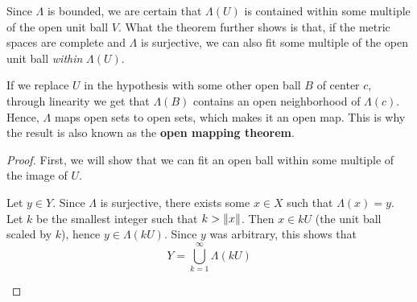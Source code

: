 \documentclass[a4paper, 12pt]{article}
\theoremstyle{definition}
\DeclarePairedDelimiter{\norm}{\lVert}{\rVert}
\begin{document}
Since \(\Lambda\) is bounded, we are certain that \(\Lambda(U)\) is contained within some multiple of the open unit ball \(V\). What the theorem further shows is that, if the metric spaces are complete and \(\Lambda\) is surjective, we can also fit some multiple of the open unit ball \emph{within} \(\Lambda(U)\).

If we replace \(U\) in the hypothesis with some other open ball \(B\) of center \(c\), through linearity we get that \(\Lambda(B)\) contains an open neighborhood of \(\Lambda(c)\). Hence, \(\Lambda\) maps open sets to open sets, which makes it an open map. This is why the result is also known as the \textbf{open mapping theorem}.

\begin{proof}
First, we will show that we can fit an open ball within some multiple of the image of \(U\).

Let \(y \in Y\). Since \(\Lambda\) is surjective, there exists some \(x \in X\) such that \(\Lambda(x) = y\). Let \(k\) be the smallest integer such that \(k > \norm{x}\). Then \(x \in kU\) (the unit ball scaled by \(k\)), hence \(y \in \Lambda(kU)\). Since \(y\) was arbitrary, this shows that
\begin{equation} \label{decomposition_of_y}
    Y = \bigcup_{k = 1}^{\infty} \Lambda (kU)
\end{equation}

\begin{figure}[h!]
    \centering
\end{figure}


\end{proof}
\end{document}
